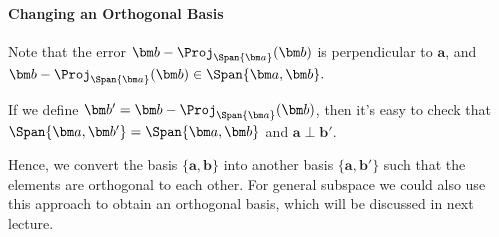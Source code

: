 \begin{itemize}
\paragraph{Changing an Orthogonal Basis}
Note that the error $\bm b-\Proj_{\Span\{\bm a\}}(\bm b)$ is perpendicular to $\bm a$, and $\bm b-\Proj_{\Span\{\bm a\}}(\bm b)\in\Span\{\bm a,\bm b\}.$

If we define $\bm b'=\bm b-\Proj_{\Span\{\bm a\}}(\bm b)$, then it's easy to check that $\Span\{\bm a,\bm b'\}=\Span\{\bm a,\bm b\}$ and $\bm a\perp\bm b'$. 

Hence, we convert the basis $\{\bm a,\bm b\}$ into another basis $\{\bm a,\bm b'\}$ such that the elements are orthogonal to each other. For general subspace we could also use this approach to obtain an orthogonal basis, which will be discussed in next lecture. 
\end{itemize}








